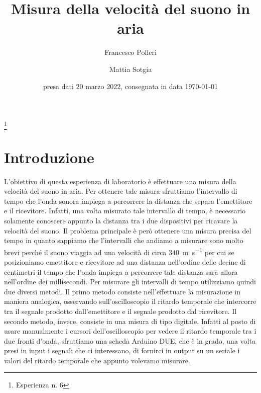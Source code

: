 \documentclass[
    rmp,
    reprint, 
    superscriptaddress, 
    altaffilletter, 
    amsmath, 
    amssymb, 
    a4paper,
    varvw]{revtex4-2}
\begin{document}
\title{Misura della velocità del suono in aria
}
\thanks{Esperienza n. 6
}

\author{Francesco Polleri}
\author{Mattia Sotgia}


\date{presa dati
    20 marzo 2022, consegnata in data 
    \today
}

\begin{abstract}

\end{abstract}

\maketitle
\thispagestyle{fancy}




\section{Introduzione}

L'obiettivo di questa esperienza di laboratorio è effettuare una misura della velocità del suono in aria. Per ottenere tale misura sfruttiamo l'intervallo di tempo che l'onda sonora impiega a percorrere la distanza che separa l'emettitore e il ricevitore. Infatti, una volta misurato tale intervallo di tempo, è necessario solamente conoscere appunto la distanza tra i due dispositivi per ricavare la velocità del suono. Il problema principale è però ottenere una misura precisa del tempo in quanto sappiamo che l'intervalli che andiamo a misurare sono molto brevi perché il suono viaggia ad una velocità di circa \SI{340}{\metre\per\second} per cui se posizioniamo emettitore e ricevitore ad una distanza nell'ordine delle decine di centimetri il tempo che l'onda impiega a percorrere tale distanza sarà allora nell'ordine dei millisecondi. 
Per misurare gli intervalli di tempo utilizziamo quindi due diversi metodi. Il primo metodo consiste nell'effettuare la misurazione in maniera analogica, osservando sull'oscilloscopio il ritardo temporale che intercorre tra il segnale prodotto dall'emettitore e il segnale prodotto dal ricevitore. Il secondo metodo, invece, consiste in una misura di tipo digitale. Infatti al posto di usare manualmente i cursori dell'oscilloscopio per vedere il ritardo temporale tra i due fronti d'onda, sfruttiamo una scheda Arduino DUE, che è in grado, una volta presi in input i segnali che ci interessano, di fornirci in output su un seriale i valori del ritardo temporale che appunto volevamo misurare.  
\end{document}
